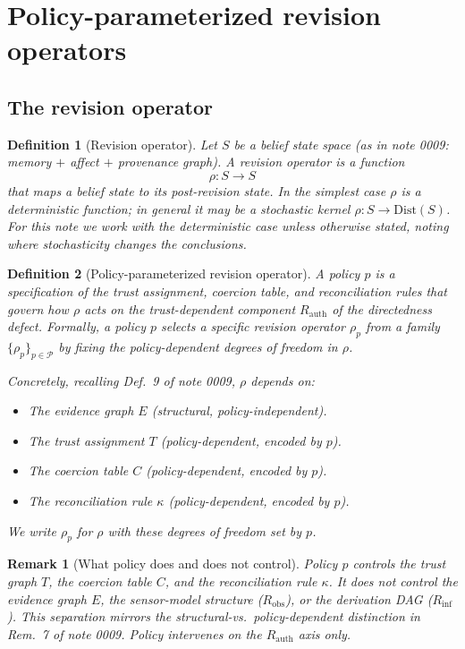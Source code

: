 \documentclass[11pt]{article}
\newtheorem{definition}{Definition}
\newtheorem{remark}{Remark}
\newcommand{\Robs}{R_{\mathrm{obs}}}
\newcommand{\Rinf}{R_{\mathrm{inf}}}
\newcommand{\Rauth}{R_{\mathrm{auth}}}
\begin{document}
\section{Policy-parameterized revision operators}
\label{sec:policy-revision}

\subsection{The revision operator}

\begin{definition}[Revision operator]
\label{def:revision-operator}
Let $S$ be a belief state space (as in note 0009: memory $+$ affect $+$ provenance graph).
A \emph{revision operator} is a function
\[
  \rho : S \to S
\]
that maps a belief state to its post-revision state. In the simplest case $\rho$ is a deterministic
function; in general it may be a stochastic kernel $\rho : S \to \mathrm{Dist}(S)$. For this note
we work with the deterministic case unless otherwise stated, noting where stochasticity changes
the conclusions.
\end{definition}

\begin{definition}[Policy-parameterized revision operator]
\label{def:policy-revision}
A \emph{policy} $p$ is a specification of the trust assignment, coercion table, and
reconciliation rules that govern how $\rho$ acts on the trust-dependent component $\Rauth$ of
the directedness defect. Formally, a policy $p$ selects a specific revision operator $\rho_p$
from a family $\{\rho_p\}_{p \in \mathcal{P}}$ by fixing the policy-dependent degrees of freedom
in $\rho$.

Concretely, recalling Def.~9 of note 0009, $\rho$ depends on:
\begin{itemize}
  \item The evidence graph $E$ (structural, policy-independent).
  \item The trust assignment $T$ (policy-dependent, encoded by $p$).
  \item The coercion table $C$ (policy-dependent, encoded by $p$).
  \item The reconciliation rule $\kappa$ (policy-dependent, encoded by $p$).
\end{itemize}
We write $\rho_p$ for $\rho$ with these degrees of freedom set by $p$.
\end{definition}

\begin{remark}[What policy does and does not control]
Policy $p$ controls the trust graph $T$, the coercion table $C$, and the reconciliation rule
$\kappa$. It does \emph{not} control the evidence graph $E$, the sensor-model structure
($\Robs$), or the derivation DAG ($\Rinf$). This separation mirrors the structural-vs.\
policy-dependent distinction in Rem.~7 of note 0009. Policy intervenes on the $\Rauth$ axis
only.
\end{remark}
\end{document}
